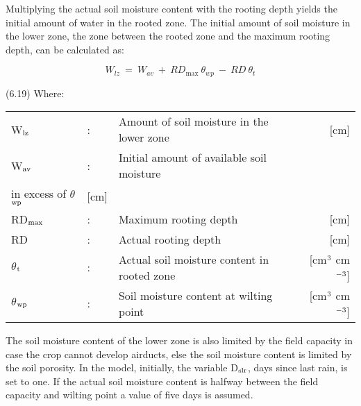 Multiplying the actual soil moisture content with the rooting depth yields the initial
amount of water in the rooted zone. The initial amount of soil moisture in the lower zone,
the zone between the rooted zone and the maximum rooting depth, can be calculated as:

\begin{equation}
W  _{lz} ~ =~ W _{av} ~+~ RD _{\max } ~\theta _{wp} ~-~RD~\theta _{t} 
\end{equation}

 
\strut\hfill (6.19)
Where:\\
\begin{tabularx}{\textwidth}{llXr}



 W$_{{\rm lz}}$ &:& Amount of soil moisture in the lower zone & [cm]\\
 W$_{{\rm av}}$ &:& Initial amount of available soil moisture \\
    in excess of $\theta$$_{{\rm wp}}$ & [cm]\\
 RD$_{{\rm max}}$ &:& Maximum rooting depth & [cm]\\
 RD &:& Actual rooting depth & [cm]\\
 $\theta$$_{{\rm t}}$ &:& Actual soil moisture content in rooted zone  & [cm$^{{\rm 3}}$ cm$^{{\rm -3}}$]\\
 $\theta$$_{{\rm wp}}$ &:& Soil moisture content at wilting point  & [cm$^{{\rm 3}}$ cm$^{{\rm -3}}$]
\end{tabularx}






The soil moisture content of the lower zone is also limited by the field capacity in case
the crop cannot develop airducts, else the soil moisture content is limited by the soil
porosity. In the model, initially, the variable D$_{{\rm slr}}$, days since last rain, is set to one. If the
actual soil moisture content is halfway between the field capacity and wilting point a
value of five days is assumed. 



